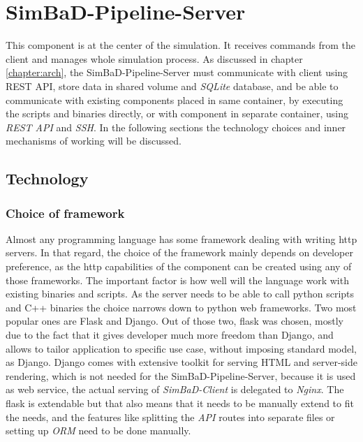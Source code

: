 \section{SimBaD-Pipeline-Server}
This component is at the center of the simulation. It receives commands from the client and manages whole simulation process.
As discussed in chapter \ref{chapter:arch}, the SimBaD-Pipeline-Server must communicate with client using REST API, store data in shared volume and \textit{SQLite} database, and be able to communicate with existing components placed in same container, by executing the scripts and binaries directly, or with component in separate container, using \textit{REST API} and \textit{SSH}. In the following sections the technology choices and inner mechanisms of working will be discussed.
\subsection{Technology}
\subsubsection{Choice of framework}
Almost any programming language has some framework dealing with writing http servers. In that regard, the choice of the framework mainly depends on developer preference, as the http capabilities of the component can be created using any of those frameworks. The important factor is how well will the language work with existing binaries and scripts. As the server needs to be able to call python scripts and C++ binaries the choice narrows down to python web frameworks. Two most popular ones are Flask and Django. Out of those two, flask was chosen, mostly due to the fact that it gives developer much more freedom than Django, and allows to tailor application to specific use case, without imposing standard model, as Django. Django comes with extensive toolkit for serving HTML and server-side rendering, which is not needed for the SimBaD-Pipeline-Server, because it is used as web service, the actual serving of \textit{SimBaD-Client} is delegated to \textit{Nginx}.
The flask is extendable but that also means that it needs to be manually extend to fit the needs, and the features like splitting the \textit{API} routes into separate files or setting up \textit{ORM} need to be done manually.
